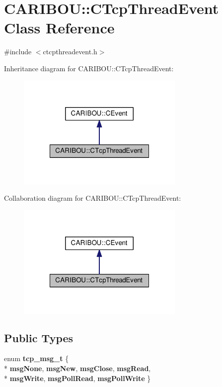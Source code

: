 \section{C\-A\-R\-I\-B\-O\-U\-:\-:C\-Tcp\-Thread\-Event Class Reference}
\label{class_c_a_r_i_b_o_u_1_1_c_tcp_thread_event}


{\ttfamily \#include $<$ctcpthreadevent.\-h$>$}



Inheritance diagram for C\-A\-R\-I\-B\-O\-U\-:\-:C\-Tcp\-Thread\-Event\-:\nopagebreak
\begin{figure}[H]
\begin{center}
\leavevmode
\includegraphics[width=228pt]{class_c_a_r_i_b_o_u_1_1_c_tcp_thread_event__inherit__graph}
\end{center}
\end{figure}


Collaboration diagram for C\-A\-R\-I\-B\-O\-U\-:\-:C\-Tcp\-Thread\-Event\-:\nopagebreak
\begin{figure}[H]
\begin{center}
\leavevmode
\includegraphics[width=228pt]{class_c_a_r_i_b_o_u_1_1_c_tcp_thread_event__coll__graph}
\end{center}
\end{figure}
\subsection*{Public Types}
\begin{DoxyCompactItemize}
\item 
enum {\bf tcp\-\_\-msg\-\_\-t} \{ \\*
{\bf msg\-None}, 
{\bf msg\-New}, 
{\bf msg\-Close}, 
{\bf msg\-Read}, 
\\*
{\bf msg\-Write}, 
{\bf msg\-Poll\-Read}, 
{\bf msg\-Poll\-Write}
 \}
\end{DoxyCompactItemize}
